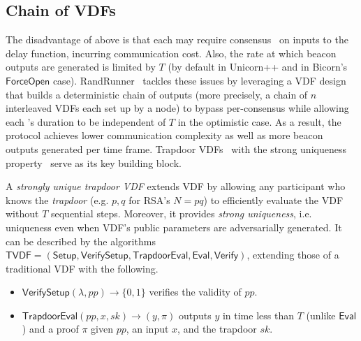 \subsection{Chain of VDFs}
\label{subsection:randrunner}
The disadvantage of above is that each \epoch may require consensus~\cite{castro1999practical} on inputs to the delay function, incurring communication cost.
Also, the rate at which beacon outputs are generated is limited by $T$ (by default in Unicorn++ and in Bicorn's $\mathsf{ForceOpen}$ case).
RandRunner~\cite{schindler2021randrunner} tackles these issues by leveraging a VDF design that builds a deterministic chain of outputs (more precisely, a chain of $n$ interleaved VDFs each set up by a node) to bypass per-\epoch consensus while allowing each \epoch's duration to be independent of $T$ in the optimistic case.
As a result, the protocol achieves lower communication complexity as well as more beacon outputs generated per time frame.
Trapdoor VDFs~\cite{wesolowski2019efficient} with the strong uniqueness property~\cite{schindler2021randrunner} serve as its key building block.

\begin{definition}
A \textit{strongly unique trapdoor VDF} extends VDF by allowing any participant who knows the \textit{trapdoor} (e.g. $p, q$ for RSA's $N = p q$) to efficiently evaluate the VDF without $T$ sequential steps. Moreover, it provides \textit{strong uniqueness}, i.e. uniqueness even when VDF's public parameters are adversarially generated. It can be described by the algorithms $\mathsf{TVDF} = (\mathsf{Setup}, \mathsf{VerifySetup}, \mathsf{TrapdoorEval}, \mathsf{Eval}, \mathsf{Verify})$, extending those of a traditional VDF with the following.
\begin{itemize}
    \item $\mathsf{VerifySetup}(\lambda, pp) \rightarrow \{0, 1\}$ verifies the validity of $pp$.
    \item $\mathsf{TrapdoorEval}(pp, x, sk) \rightarrow (y, \pi)$ outputs $y$ in time less than $T$ (unlike $\mathsf{Eval}$) and a proof $\pi$ given $pp$, an input $x$, and the trapdoor $sk$.
\end{itemize}
\end{definition}

